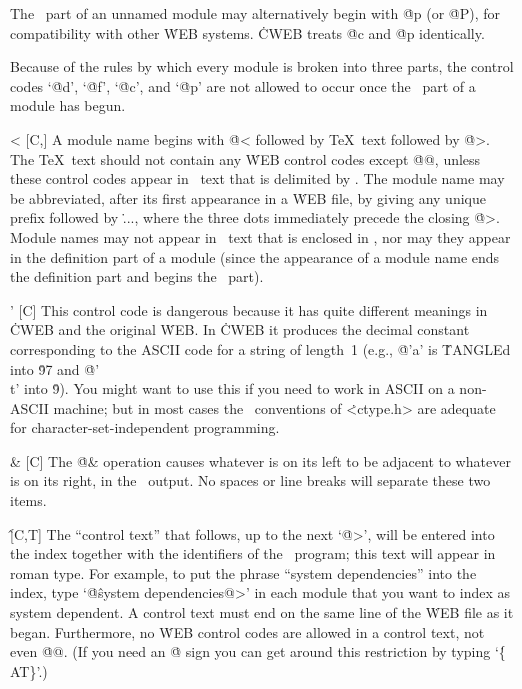\@p [\oP,\oT] The \Cee\ part of an unnamed module may alternatively begin
with \.{@p} (or \.{@P}), for compatibility with other \.{WEB} systems.
\.{CWEB} treats \.{@c} and \.{@p} identically.

\more Because of the rules by which every module is broken into three parts,
the control codes `\.{@d}', `\.{@f}', `\.{@c}', and `\.{@p}'
are not allowed to occur once the \Cee\ part of a module has begun.

\@< [C,\oT] A module name begins with \.{@<} followed by \TeX\ text followed
by \.{@>}. The \TeX\ text should not contain any \.{WEB} control codes
except \.{@@}, unless these control codes appear in \Cee\ text that
is delimited by \pb. The module name may be abbreviated, after its first
appearance in a \.{WEB} file, by giving any unique prefix followed by \.{...},
where the three dots immediately precede the closing \.{@>}. Module names may
not appear in \Cee\ text that is enclosed in \pb, nor may they appear
in the definition part of a module (since the appearance of a module name
ends the definition part and begins the \Cee\ part).

\@' [C] This control code is dangerous because it has quite different
meanings in \.{CWEB} and the original \.{WEB}. In \.{CWEB} it produces the
decimal constant corresponding to the ASCII code for a string of length~1
(e.g., \.{@'a'} is \.{TANGLE}d into \.{97} and \.{@'\\t'} into
\.9). You might want to use this if you need to work in ASCII on a
non-ASCII machine; but in most cases the \Cee\ conventions of
\.{<ctype.h>} are adequate for character-set-independent programming.

\@\& [C] The \.{@\&} operation causes whatever is on its left to be
adjacent to whatever is on its right, in the \Cee\ output. No spaces or
line breaks will separate these two items.

\@\^ [C,T] The ``control text'' that follows, up to the next
`\.{@>}', will be entered into the index together with the identifiers of
the \Cee\ program; this text will appear in roman type. For example, to
put the phrase ``system dependencies'' into the index, type
`\.{@\^system dependencies@>}' in each module
that you want to index as system dependent. A control text
must end on the same line of the \.{WEB} file as it began.  Furthermore,
no \.{WEB} control codes are allowed in a control text, not even
\.{@@}. (If you need an \.{@} sign you can get around this restriction by
typing `\.{\{\\AT\}}'.)

